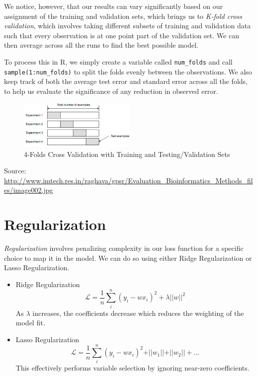 We notice, however, that our results can vary significantly based on our assignment of the training and validation sets, which brings us to \emph{K-fold cross validation}, which involves taking different subsets of training and validation data such that every observation is at one point part of the validation set. We can then average across all the runs to find the best possible model.

To process this in R, we simply create a variable called \texttt{num\_folds} and call \texttt{sample(1:num\_folds)} to split the folds evenly between the observations. We also keep track of both the average test error and standard error across all the folds, to help us evaluate the significance of any reduction in observed error.

\begin{figure}[h]
\begin{center}
\includegraphics[width=0.5\textwidth]{KFolds.jpg}
\caption{4-Folds Cross Validation with Training and Testing/Validation Sets}
\end{center}
\end{figure}

\small{Source: \url{http://www.imtech.res.in/raghava/gpsr/Evaluation_Bioinformatics_Methods_files/image002.jpg}}

\section{Regularization}

\emph{Regularization} involves penalizing complexity in our loss
function for a specific choice to map it in the model. We can do so using either Ridge Regularization or Lasso Regularization. \begin{itemize}
\item Ridge Regularization \[\mathcal{L}=\frac{1}{n}\sum_i^n(y_i-wx_i)^2+\lambda \vert\vert w\vert\vert^2\]As \(\lambda\) increases, the coefficients decrease which reduces the weighting of the model fit.
\item Lasso Regularization \[\mathcal{L}=\frac{1}{n}\sum_i^n(y_i-wx_i)^2+\vert\vert w_1\vert\vert+\vert\vert w_2\vert\vert+...\] This effectively performs variable selection by ignoring near-zero coefficients.
\end{itemize}

